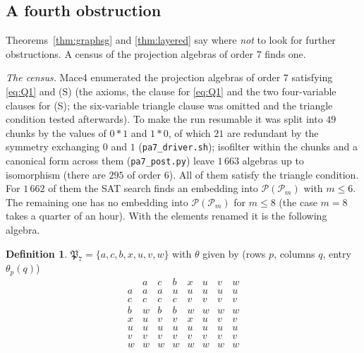 \documentclass[11pt]{amsart}
\theoremstyle{definition}
\newtheorem{definition}[theorem]{Definition}
\renewcommand{\P}{\mathcal{P}}
\begin{document}
\subsection{A fourth obstruction}\label{subsec:fourth}

Theorems~\ref{thm:graphsg} and \ref{thm:layered} say where \emph{not} to look for further obstructions. A census of the projection algebras of order $7$ finds one.

\emph{The census.} Mace4 enumerated the projection algebras of order $7$ satisfying \eqref{eq:Q1} and (S) (the axioms, the clause for \eqref{eq:Q1} and the two four-variable clauses for (S); the six-variable triangle clause was omitted and the triangle condition tested afterwards). To make the run resumable it was split into $49$ chunks by the values of $0*1$ and $1*0$, of which $21$ are redundant by the symmetry exchanging $0$ and $1$ (\texttt{pa7\_driver.sh}); isofilter within the chunks and a canonical form across them (\texttt{pa7\_post.py}) leave $1\,663$ algebras up to isomorphism (there are $295$ of order $6$). All of them satisfy the triangle condition. For $1\,662$ of them the SAT search finds an embedding into $\P(\P_m)$ with $m\le6$. The remaining one has no embedding into $\P(\P_m)$ for $m\le8$ (the case $m=8$ takes a quarter of an hour). With the elements renamed it is the following algebra.

\begin{definition}\label{def:P7}
$\mathfrak P_7=\{a,c,b,x,u,v,w\}$ with $\theta$ given by (rows $p$, columns $q$, entry $\theta_p(q)$)
\[
\begin{array}{c|ccccccc}
 & a & c & b & x & u & v & w\\ \hline
a & a & a & u & u & u & u & u\\
c & c & c & c & v & v & v & v\\
b & w & b & b & w & w & w & w\\
x & u & v & v & x & u & v & v\\
u & u & u & u & u & u & u & u\\
v & v & v & v & v & v & v & v\\
w & w & w & w & w & w & w & w
\end{array}
\]
\end{definition}
\end{document}
